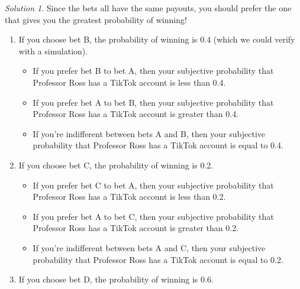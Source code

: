 \documentclass[
  letterpaper,
  DIV=11,
  numbers=noendperiod]{scrreprt}
\providecommand{\tightlist}{%
  \setlength{\itemsep}{0pt}\setlength{\parskip}{0pt}}
\theoremstyle{plain}
\theoremstyle{definition}
\theoremstyle{definition}
\theoremstyle{definition}
\theoremstyle{remark}
\newtheorem{refsolution}{Solution}[chapter]
\begin{document}
\begin{tcolorbox}[enhanced jigsaw, opacityback=0, rightrule=.15mm, coltitle=black, colframe=quarto-callout-tip-color-frame, toprule=.15mm, colbacktitle=quarto-callout-tip-color!10!white, opacitybacktitle=0.6, left=2mm, toptitle=1mm, breakable, title={Solution (click to expand)}, bottomtitle=1mm, colback=white, leftrule=.75mm, titlerule=0mm, arc=.35mm, bottomrule=.15mm]

\begin{refsolution}
Since the bets all have the same payouts, you should prefer the one that
gives you the greatest probability of winning!

\begin{enumerate}
\def\labelenumi{\arabic{enumi}.}
\tightlist
\item
  If you choose bet B, the probability of winning is 0.4 (which we could
  verify with a simulation).

  \begin{itemize}
  \tightlist
  \item
    If you prefer bet B to bet A, then your subjective probability that
    Professor Ross has a TikTok account is less than 0.4.
  \item
    If you prefer bet A to bet B, then your subjective probability that
    Professor Ross has a TikTok account is greater than 0.4.
  \item
    If you're indifferent between bets A and B, then your subjective
    probability that Professor Ross has a TikTok account is equal to
    0.4.\\
  \end{itemize}
\item
  If you choose bet C, the probability of winning is 0.2.

  \begin{itemize}
  \tightlist
  \item
    If you prefer bet C to bet A, then your subjective probability that
    Professor Ross has a TikTok account is less than 0.2.
  \item
    If you prefer bet A to bet C, then your subjective probability that
    Professor Ross has a TikTok account is greater than 0.2.
  \item
    If you're indifferent between bets A and C, then your subjective
    probability that Professor Ross has a TikTok account is equal to
    0.2.\\
  \end{itemize}
\item
  If you choose bet D, the probability of winning is 0.6.


\end{enumerate}
\end{refsolution}
\end{tcolorbox}
\end{document}
